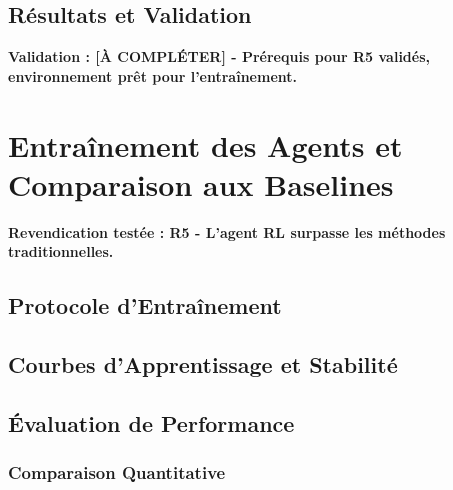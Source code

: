 \subsection{Résultats et Validation}
\label{subsec:resultats_env_rl}

\textbf{Validation : [À COMPLÉTER] - Prérequis pour R5 validés, environnement prêt pour l'entraînement.}

\section{Entraînement des Agents et Comparaison aux Baselines}
\label{sec:entrainement_agents}

\textbf{Revendication testée : R5 - L'agent RL surpasse les méthodes traditionnelles.}

\subsection{Protocole d'Entraînement}
\label{subsec:protocole_entrainement}

\subsection{Courbes d'Apprentissage et Stabilité}
\label{subsec:courbes_apprentissage}

\subsection{Évaluation de Performance}
\label{subsec:evaluation_performance}

\subsubsection{Comparaison Quantitative}

